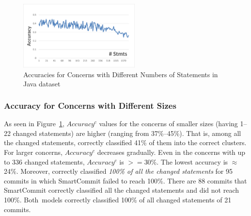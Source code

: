 \begin{figure}[t]
	\centering \includegraphics[width=2.4in]{figures/accuracy-concerns-java.png}
	\vspace{-6pt}
	\caption{Accuracies for Concerns with Different Numbers of Statements in Java dataset}
	\label{RQ2-result-3}
\end{figure}






\subsubsection{Accuracy for Concerns with Different Sizes}

As seen in Figure~\ref{RQ2-result-3}, $Accuracy^{c}$ values for the
concerns of smaller sizes (having 1--22 changed statements) are higher
(ranging from 37\%--45\%). That is, among all the changed statements,
{\tool} correctly classified 41\% of them into the correct clusters.
For larger concerns, $Accuracy^{c}$ decreases gradually. Even in the
concerns with up to 336 changed statements, $Accuracy^{c}$ is
$>=$30\%. The lowest accuracy is $\approx$ 24\%. Moreover, {\tool}
correctly classified {\em 100\% of all the changed statements} for 95
commits in which SmartCommit failed to reach 100\%. There are 88
commits that SmartCommit correctly classified all the changed
statements and {\tool} did not reach 100\%. Both~models correctly
classified 100\% of all changed statements of 21 commits.

